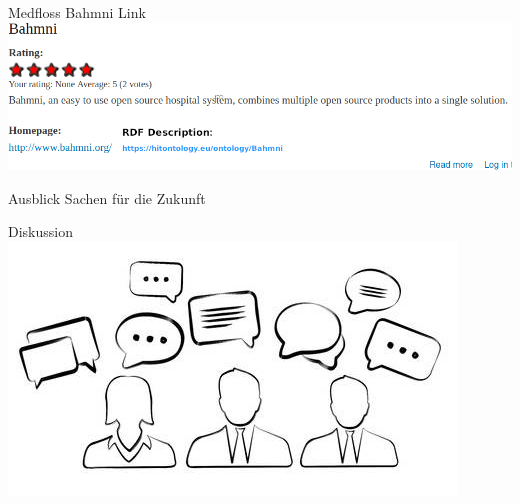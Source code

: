 \documentclass[aspectratio=1610,12pt]{beamer}
\begin{document}
\begin{frame}{Medfloss Bahmni Link}
  \includegraphics[width=\textwidth]{img/medfloss-bahmni-link.png}
\end{frame}

\begin{frame}{Ausblick}
  Sachen für die Zukunft
\end{frame}


\begin{frame}{Diskussion}
  \centering
  \vspace{-0.5cm}
  \includegraphics[width=\textwidth]{img/discussion.png}
\end{frame}
\end{document}
